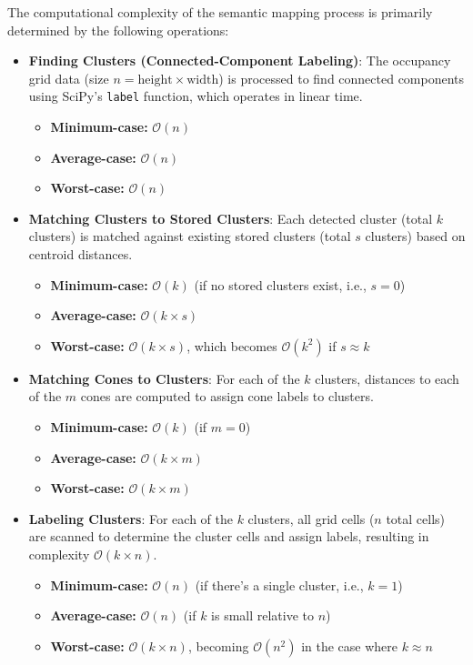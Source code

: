 The computational complexity of the semantic mapping process is primarily determined by the following operations:

\begin{itemize}

    \item \textbf{Finding Clusters (Connected-Component Labeling)}:  
    The occupancy grid data (size $n = \text{height} \times \text{width}$) is processed to find connected components using SciPy's \texttt{label} function, which operates in linear time.
    \begin{itemize}
        \item \textbf{Minimum-case:} $\mathcal{O}(n)$
        \item \textbf{Average-case:} $\mathcal{O}(n)$
        \item \textbf{Worst-case:} $\mathcal{O}(n)$
    \end{itemize}

    \item \textbf{Matching Clusters to Stored Clusters}:  
    Each detected cluster (total $k$ clusters) is matched against existing stored clusters (total $s$ clusters) based on centroid distances.
    \begin{itemize}
        \item \textbf{Minimum-case:} $\mathcal{O}(k)$ (if no stored clusters exist, i.e., $s=0$)
        \item \textbf{Average-case:} $\mathcal{O}(k \times s)$
        \item \textbf{Worst-case:} $\mathcal{O}(k \times s)$, which becomes $\mathcal{O}(k^2)$ if $s \approx k$
    \end{itemize}

    \item \textbf{Matching Cones to Clusters}:  
    For each of the $k$ clusters, distances to each of the $m$ cones are computed to assign cone labels to clusters.
    \begin{itemize}
        \item \textbf{Minimum-case:} $\mathcal{O}(k)$ (if $m = 0$)
        \item \textbf{Average-case:} $\mathcal{O}(k \times m)$
        \item \textbf{Worst-case:} $\mathcal{O}(k \times m)$
    \end{itemize}

    \item \textbf{Labeling Clusters}:  
    For each of the $k$ clusters, all grid cells ($n$ total cells) are scanned to determine the cluster cells and assign labels, resulting in complexity $\mathcal{O}(k \times n)$.
    \begin{itemize}
        \item \textbf{Minimum-case:} $\mathcal{O}(n)$ \quad(if there's a single cluster, i.e., $k=1$)
        \item \textbf{Average-case:} $\mathcal{O}(n)$ \quad(if $k$ is small relative to $n$)
        \item \textbf{Worst-case:} $\mathcal{O}(k \times n)$, becoming $\mathcal{O}(n^2)$ in the case where $k \approx n$
    \end{itemize}


\end{itemize}
